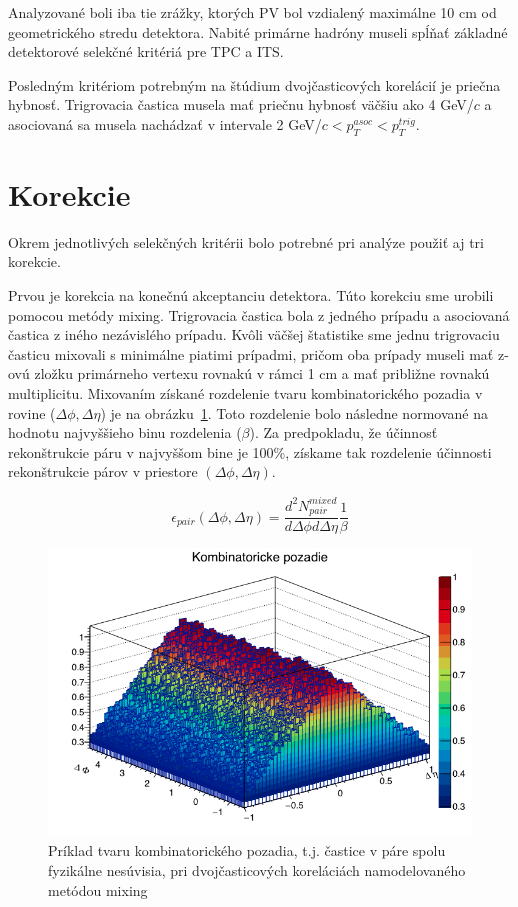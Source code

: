 \documentclass[thesismargins, thesislinespacing]{rnthesis}
\begin{document}
Analyzované boli iba tie zrážky, ktorých PV bol vzdialený maximálne 10 cm od geometrického stredu detektora. Nabité primárne hadróny museli spĺňať základné detektorové selekčné kritériá pre TPC a ITS. 

Posledným kritériom potrebným na štúdium dvojčasticových korelácií je priečna hybnosť. Trigrovacia častica musela mať priečnu hybnosť väčšiu ako 4 GeV/$c$ a asociovaná sa musela nachádzať v intervale 2 GeV/$c<p_T^{asoc}<p_T^{trig}$.

\section{Korekcie}
Okrem jednotlivých selekčných kritérii bolo potrebné pri analýze použiť aj tri korekcie. 

Prvou je korekcia na konečnú akceptanciu detektora. Túto korekciu sme urobili pomocou metódy mixing. Trigrovacia častica bola z jedného prípadu a asociovaná častica z iného nezávislého prípadu. Kvôli väčšej štatistike sme jednu trigrovaciu časticu mixovali s minimálne piatimi prípadmi, pričom oba prípady museli mať z-ovú zložku primárneho vertexu rovnakú v rámci 1 cm a mať približne rovnakú multiplicitu. Mixovaním získané rozdelenie tvaru kombinatorického pozadia v rovine ($\Delta \phi, \Delta \eta$) je na obrázku~\ref{pozadie}. Toto rozdelenie bolo následne normované na hodnotu najvyššieho binu rozdelenia ($\beta$). Za predpokladu, že účinnosť rekonštrukcie páru v najvyššom bine je 100\%, získame tak rozdelenie účinnosti rekonštrukcie párov v priestore $(\Delta \phi,\Delta\eta)$.

\begin{equation}
	\epsilon_{pair}(\Delta\phi,\Delta\eta) = \frac{d^2N^{mixed}_{pair}}{d\Delta\phi d\Delta\eta}\frac{1}{\beta}
\end{equation}

\begin{figure}[hbtp!]
	\centering
	\includegraphics[scale=0.5]{./Obrazky_praca/pozadie.png}
	\caption{Príklad tvaru kombinatorického pozadia, t.j. častice v páre spolu fyzikálne nesúvisia, pri dvojčasticových koreláciách namodelovaného metódou mixing}
	\label{pozadie}
\end{figure}
\end{document}
